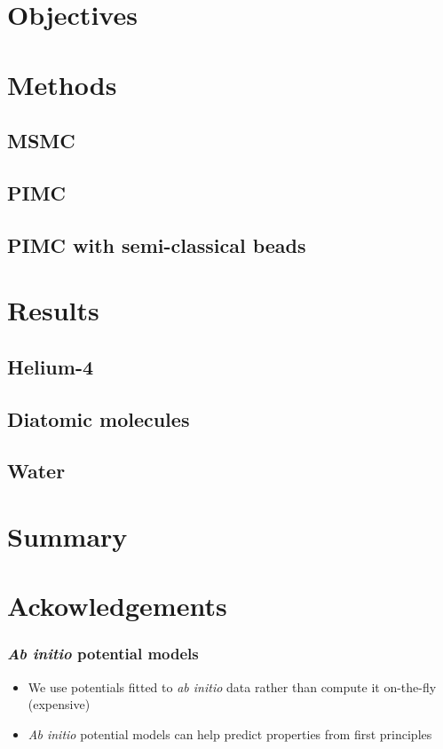 \documentclass[xcolor=svgnames]{beamer}
\newcommand{\Abinitio}[0]{\emph{Ab initio}}
\begin{document}
	\section{Objectives}
	\section{Methods}
	\subsection{MSMC}
	\subsection{PIMC}
	\subsection{PIMC with semi-classical beads}
	\section{Results}
	\subsection{Helium-4}
	\subsection{Diatomic molecules}
	\subsection{Water}
	\section{Summary}
	\section*{Ackowledgements}

	\begin{frame}
	\frametitle{\Abinitio{} potential models}
	\begin{itemize} 
		\item We use potentials fitted to \emph{ab initio} data rather than compute it on-the-fly (expensive)
		\item \emph{Ab initio} potential models can help predict properties from first principles
	\end{itemize}
	\end{frame}
\end{document}
